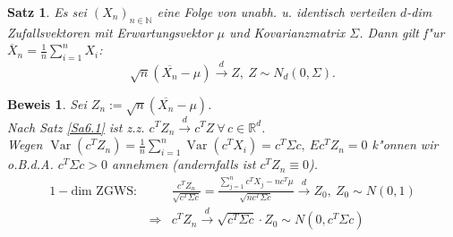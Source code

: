 \documentclass[a4paper,11pt]{scrbook}
\newcommand{\R}{{\mathbb R}}
\newcommand{\N}{{\mathbb N}}
\DeclareMathOperator{\var}{Var}
\def\dto{\stackrel{d}{\rightarrow}}
\newtheorem{Sa}{Satz}[chapter]
\theoremstyle{nonumberplain}
\newtheorem{Bew}{Beweis}
\begin{document}
\begin{Sa} \label{Sa6.5}
Es sei $(X_n)_{n \in \N}$ eine Folge von unabh. u. identisch verteilen $d$-dim Zufallsvektoren mit Erwartungsvektor $\mu$ und Kovarianzmatrix $\Sigma$. Dann gilt f"ur $\overline{X}_n = \frac1{n} \sum_{i=1}^n X_i$:
\[
\sqrt{n} (\overline{X_n} - \mu) \dto Z,\ Z \sim N_d(0,\Sigma).
\]
\end{Sa}

\begin{Bew}
Sei $Z_n := \sqrt{n} (\overline{X_n} - \mu)$.\\
Nach Satz \ref{Sa6.1} ist z.z. $c^T Z_n \dto c^TZ\ \forall\, c \in \R^d$.\\
Wegen $\var(c^T Z_n) = \frac1{n} \sum_{i=1}^n \var(c^T X_i) = c^T \Sigma c,\ Ec^T Z_n = 0$ k"onnen wir o.B.d.A. $c^T \Sigma c> 0$ annehmen (andernfalls ist $c^T Z_n \equiv 0$).
\begin{eqnarray*}
1-\text{dim ZGWS}: & & \frac{c^T Z_n}{\sqrt{c^T \Sigma c}} = \frac{\sum_{j=1}^n c^T X_j - n c^T \mu}{\sqrt{n c^T \Sigma c}} \dto Z_0, \ Z_0 \sim N(0,1) \\
& \Rightarrow & c^T Z_n \dto \sqrt{c^T \Sigma c} \cdot Z_0 \sim N(0,c^T \Sigma c)
\end{eqnarray*}
\end{Bew}
\end{document}
